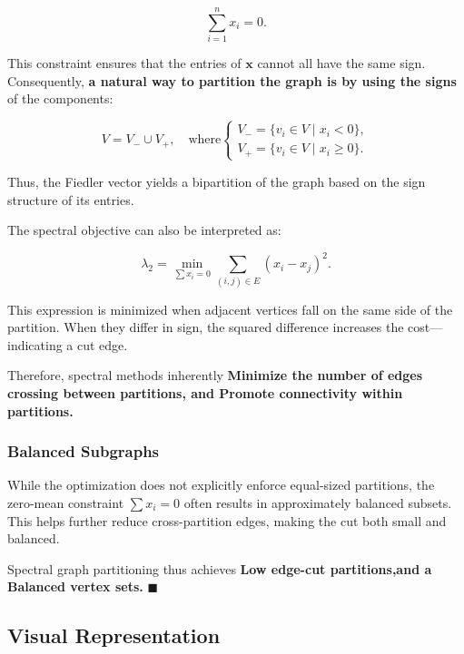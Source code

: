 \documentclass[hidelinks,12pt]{article}
\begin{document}
\[
\sum_{i=1}^n x_i = 0.
\]

\noindent This constraint ensures that the entries of \( \mathbf{x} \) cannot all have the same sign. Consequently,\textbf{ a natural way to partition the graph is by using the signs} of the components:

\[
V = V_- \cup V_+, \quad \text{where}
\begin{cases}
V_- = \{ v_i \in V \mid x_i < 0 \}, \\
V_+ = \{ v_i \in V \mid x_i \geq 0 \}.
\end{cases}
\]

\noindent Thus, the Fiedler vector yields a bipartition of the graph based on the sign structure of its entries.


\noindent The spectral objective can also be interpreted as:

\[
\lambda_2 = \min_{\sum x_i = 0} \sum_{(i,j) \in E} (x_i - x_j)^2.
\]

\noindent This expression is minimized when adjacent vertices fall on the same side of the partition. When they differ in sign, the squared difference increases the cost—indicating a cut edge.

\noindent Therefore, spectral methods inherently \textbf{ Minimize the number of edges crossing between partitions, and Promote connectivity within partitions.}

\subsubsection*{Balanced Subgraphs}

While the optimization does not explicitly enforce equal-sized partitions, the zero-mean constraint \( \sum x_i = 0 \) often results in approximately balanced subsets. This helps further reduce cross-partition edges, making the cut both small and balanced.

\noindent Spectral graph partitioning thus achieves \textbf{Low edge-cut partitions,and a Balanced vertex sets.} \hfill \(\blacksquare\)

\subsection*{Visual Representation}
\end{document}
